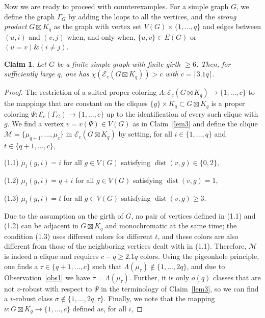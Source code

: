 \documentclass{amsart}
\newtheorem{claim}[thr]{Claim}
\theoremstyle{definition}
\theoremstyle{remark}
\numberwithin{equation}{section}
\def\E{\mathcal{E}}
\def\E{\mathcal{E}}
\begin{document}
\bigskip

Now we are ready to proceed with counterexamples. For a simple graph $G$, we define the graph $\Gamma_G$ by adding the loops to all the vertices, and the \textit{strong product} $G\boxtimes K_q$ as the graph with vertex set $V(G)\times\{1,\ldots,q\}$ and edges between $(u,i)$ and $(v,j)$ when, and only when, $\{u,v\}\in E(G)$ or $(u=v)\&(i\neq j)$.

\begin{claim}\label{claim4}
Let $G$ be a finite simple graph with finite girth $\geqslant 6$. Then, for sufficiently large $q$, one has $\chi\left(\E_c(G\boxtimes K_q)\right)>c$ with $c=\lceil 3.1q\rceil$.
\end{claim}

\begin{proof}
The restriction of a suited proper coloring $\Lambda:\E_c(G\boxtimes K_q)\to\{1,\ldots,c\}$ to the mappings that are constant on the cliques $\{g\}\times K_q\subset G\boxtimes K_q$ is a proper coloring $\Psi:\E_c(\Gamma_G)\to\{1,\ldots,c\}$ up to the identification of every such clique with $g$. We find a vertex $v=v\left(\Psi\right)\in V(G)$  as in Claim~\ref{lem3} and define the clique $\mathcal{M}=\{\mu_{q+1},\ldots,\mu_c\}$ in $\E_c(G\boxtimes K_q)$ by setting, for all $i\in\{1,\ldots,q\}$ and $t\in\{q+1,\ldots,c\}$,

\smallskip

\noindent (1.1) $\mu_t(g, i)=i$ for all $g\in V(G)$ satisfying $\operatorname{dist}(v,g)\in\{0,2\}$,

\noindent (1.2) $\mu_t(g, i)=q+i$ for all $g\in V(G)$ satisfying $\operatorname{dist}(v,g)=1$,

\noindent (1.3) $\mu_t(g,i)=t$ for all $g\in V(G)$ satisfying $\operatorname{dist}(v,g)\geqslant 3$.

\smallskip

Due to the assumption on the girth of $G$, no pair of vertices defined in (1.1) and (1.2) can be adjacent in $G\boxtimes K_q$ and monochromatic at the same time; the condition (1.3) uses different colors for different $t$, and these colors are also different from those of the neighboring vertices dealt with in (1.1). Therefore, $\mathcal{M}$ is indeed a clique and requires $c-q\geqslant 2.1q$ colors. Using the pigeonhole principle, one finds a $\tau\in\{q+1,\ldots,c\}$ such that $\Lambda(\mu_\tau)\notin\{1,\ldots,2q\}$, and due to Observation~\ref{obs1} we have $\tau=\Lambda(\mu_\tau)$. Further, it is only $o(q)$ classes that are not $v$-robust with respect to $\Psi$ in the terminology of Claim~\ref{lem3}, so we can find a $v$-robust class $\sigma\notin\{1,\ldots,2q,\tau\}$. %
Finally, we note that the mapping $\nu:G\boxtimes K_q\to\{1,\ldots,c\}$ defined as, for all $i$,


\end{proof}
\end{document}

